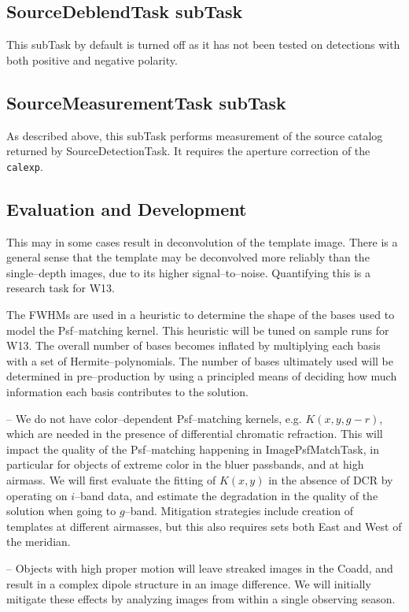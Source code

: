 \documentclass[prd, nofootinbib, floatfix, 11pt,tightenlines,times]{article}
\begin{document}
\subsection{SourceDeblendTask subTask}
This subTask by default is turned off as it has not been tested on detections
with both positive and negative polarity.

\subsection{SourceMeasurementTask subTask}
As described above, this subTask performs measurement of the source
catalog returned by SourceDetectionTask.  It requires the aperture
correction of the {\tt calexp}.

\subsection{Evaluation and Development}

This may in some cases result in
deconvolution of the template image.  There is a general sense that
the template may be deconvolved more reliably than the single--depth
images, due to its higher signal--to--noise.  Quantifying this is a
research task for W13.

The FWHMs are used in a heuristic to determine the shape of
the bases used to model the Psf--matching kernel.  This heuristic will
be tuned on sample runs for W13.  The overall number of bases becomes
inflated by multiplying each basis with a set of Hermite--polynomials.
The number of bases ultimately used will be determined in
pre--production by using a principled means of deciding how much
information each basis contributes to the solution.  

-- We do not have color--dependent Psf--matching kernels,
e.g. $K(x,y,g-r)$, which are needed in the presence of differential
chromatic refraction.  This will impact the quality of the
Psf--matching happening in ImagePsfMatchTask, in particular for
objects of extreme color in the bluer passbands, and at high airmass.
We will first evaluate the fitting of $K(x,y)$ in the absence of
DCR by operating on $i$--band data, and estimate the degradation in
the quality of the solution when going to $g$--band.  Mitigation
strategies include creation of templates at different airmasses, but
this also requires sets both East and West of the meridian.

-- Objects with high proper motion will leave streaked images in the
Coadd, and result in a complex dipole structure in an image
difference.  We will initially mitigate these effects by analyzing
images from within a single observing season.
\end{document}
